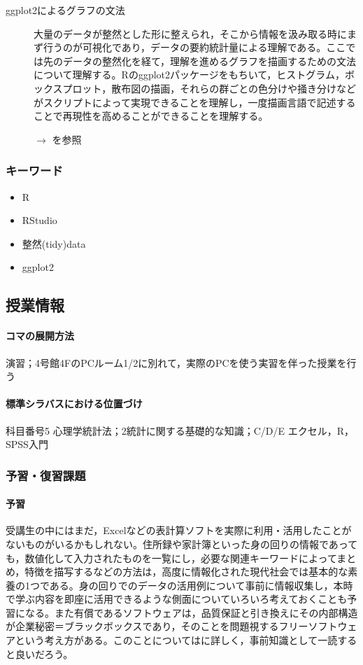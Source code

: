 \begin{description}
\item[ggplot2によるグラフの文法]大量のデータが整然とした形に整えられ，そこから情報を汲み取る時にまず行うのが可視化であり，データの要約統計量による理解である。ここでは先のデータの整然化を経て，理解を進めるグラフを描画するための文法について理解する。Rのggplot2パッケージをもちいて，ヒストグラム，ボックスプロット，散布図の描画，それらの群ごとの色分けや掻き分けなどがスクリプトによって実現できることを理解し，一度描画言語で記述することで再現性を高めることができることを理解する。
\begin{flushright}
    $\to$ \citet{紀ノ定201806}を参照
\end{flushright}

\end{description}
\subsubsection{キーワード}
\begin{itemize}
\item R
\item RStudio
\item 整然(tidy)data
\item ggplot2
\end{itemize}
\subsection{授業情報}
\paragraph{コマの展開方法}
演習；4号館4FのPCルーム1/2に別れて，実際のPCを使う実習を伴った授業を行う
\paragraph{標準シラバスにおける位置づけ}
科目番号5 心理学統計法；2統計に関する基礎的な知識；C/D/E エクセル，R，SPSS入門
\subsubsection{予習・復習課題}
\paragraph{予習}
受講生の中にはまだ，Excelなどの表計算ソフトを実際に利用・活用したことがないものがいるかもしれない。住所録や家計簿といった身の回りの情報であっても，数値化して入力されたものを一覧にし，必要な関連キーワードによってまとめ，特徴を描写するなどの方法は，高度に情報化された現代社会では基本的な素養の1つである。身の回りでのデータの活用例について事前に情報収集し，本時で学ぶ内容を即座に活用できるような側面についていろいろ考えておくことも予習になる。また有償であるソフトウェアは，品質保証と引き換えにその内部構造が企業秘密＝ブラックボックスであり，そのことを問題視するフリーソフトウェアという考え方がある。このことについては\cite{長尾200305}に詳しく，事前知識として一読すると良いだろう。
